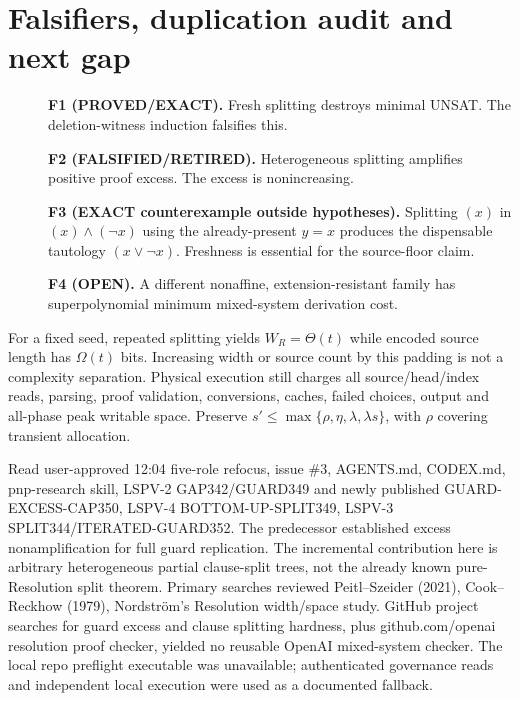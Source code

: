 \documentclass[11pt]{article}
\begin{document}
\section*{Falsifiers, duplication audit and next gap}
\begin{description}
\item[] \textbf{F1 (PROVED/EXACT).} Fresh splitting destroys minimal UNSAT. The deletion-witness induction falsifies this.
\item[] \textbf{F2 (FALSIFIED/RETIRED).} Heterogeneous splitting amplifies positive proof excess. The excess is nonincreasing.
\item[] \textbf{F3 (EXACT counterexample outside hypotheses).} Splitting $(x)$ in $(x)\wedge(\neg x)$ using the already-present $y=x$ produces the dispensable tautology $(x\vee\neg x)$. Freshness is essential for the source-floor claim.
\item[] \textbf{F4 (OPEN).} A different nonaffine, extension-resistant family has superpolynomial minimum mixed-system derivation cost.
\end{description}
For a fixed seed, repeated splitting yields $W_R=\Theta(t)$ while encoded source length has $\Omega(t)$ bits. Increasing width or source count by this padding is not a complexity separation. Physical execution still charges all source/head/index reads, parsing, proof validation, conversions, caches, failed choices, output and all-phase peak writable space. Preserve $s'\le\max\{\rho,\eta,\lambda,\lambda s\}$, with $\rho$ covering transient allocation.

Read user-approved 12:04 five-role refocus, issue \#3, AGENTS.md, CODEX.md, pnp-research skill, LSPV-2 GAP342/GUARD349 and newly published GUARD-EXCESS-CAP350, LSPV-4 BOTTOM-UP-SPLIT349, LSPV-3 SPLIT344/ITERATED-GUARD352. The predecessor established excess nonamplification for full guard replication. The incremental contribution here is arbitrary heterogeneous partial clause-split trees, not the already known pure-Resolution split theorem. Primary searches reviewed Peitl--Szeider (2021), Cook--Reckhow (1979), Nordstr\"om's Resolution width/space study. GitHub project searches for guard excess and clause splitting hardness, plus github.com/openai resolution proof checker, yielded no reusable OpenAI mixed-system checker. The local repo preflight executable was unavailable; authenticated governance reads and independent local execution were used as a documented fallback.
\end{document}
